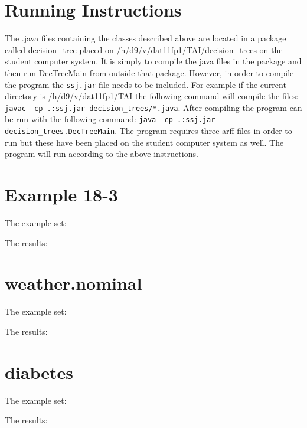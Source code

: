 \documentclass[a4paper]{article}
\begin{document}
\section{Running Instructions} The .java files containing the classes described
above are located in a package called decision\_tree placed on
/h/d9/v/dat11fp1/TAI/decision\_trees on the student computer system. It
is simply to compile the java files in the package and then run DecTreeMain from
outside that package. However, in order to compile the program the \texttt{ssj.jar} file needs to be included. For example if the current directory is
/h/d9/v/dat11fp1/TAI the following command will compile the files: \texttt{javac -cp .:ssj.jar
decision\_trees/*.java}. After compiling the program can be run with
the following command: \texttt{java -cp .:ssj.jar decision\_trees.DecTreeMain}. The program requires three arff files in order to run but these have been placed on the student computer system as well. The program will run according to the above instructions.

\appendix
\section{Example 18-3}
\label{18-3}
The example set:

The results:

\section{weather.nominal}
\label{weather}
The example set:

The results:


\section{diabetes}
\label{diabetes}
The example set:

The results:

\end{document}
